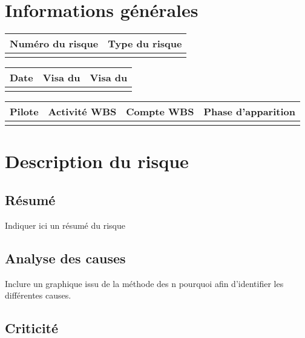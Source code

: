 \section*{Informations générales}
 
\begin{table}[H]
\centering
	\begin{tabularx}{16.8cm}{|X|X|}
	\hline
	\rowcolor{gray!40} Numéro du risque & Type du risque \\
	\hline
	 &  \\
	\hline
	\end{tabularx}
\end{table}

\begin{table}[H]
\centering
	\begin{tabularx}{16.8cm}{|X|X|X|}
	\hline
	\rowcolor{gray!40} Date & Visa du \RQ & Visa du \CP \\
	\hline
	  & & \\
	\hline
	\end{tabularx}
\end{table}

\begin{table}[H]
\centering
	\begin{tabularx}{16.8cm}{|X|X|X|X|}
	\hline
	\rowcolor{gray!40} Pilote & Activité WBS & Compte WBS & Phase d'apparition \\
	\hline
	  & & &\\
	\hline
	\end{tabularx}
\end{table}

\section*{Description du risque}

\subsection*{Résumé}
	Indiquer ici un résumé du risque
	
\subsection*{Analyse des causes}
	Inclure un graphique issu de la méthode des n pourquoi afin d'identifier les différentes causes.

\subsection*{Criticité}

